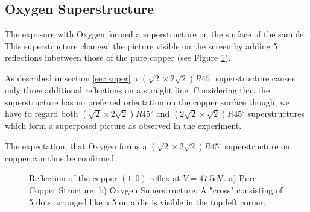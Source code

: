 \documentclass[a4paper]{scrartcl}
\numberwithin{equation}{section}
\numberwithin{figure}{section}
\numberwithin{table}{section}
\begin{document}
\subsection{Oxygen Superstructure}
The exposure with Oxygen formed a superstructure on the surface of the sample. This superstructure changed the picture visible on the screen by adding 5 reflections inbetween those of the pure copper (see Figure \ref{fig:super}).

As described in section \ref{sec:super} a $(\sqrt{2} \times 2\sqrt{2})R45^\circ$ superstructure causes only three additional reflections on a straight line. Considering that the superstructure has no preferred orientation on the copper surface though, we have to regard both $(\sqrt{2} \times 2\sqrt{2})R45^\circ$ and $(2\sqrt{2} \times \sqrt{2})R45^\circ$ superstructures which form a superposed picture as observed in the experiment. 

The expectation, that Oxygen forms a $(\sqrt{2} \times 2\sqrt{2})R45^\circ$ superstructure on copper can thus be confirmed.
\begin{figure} 
 \centering
{}
\hfill
{}
	\caption{\small Reflection of the copper $(1,0)$ reflex at $V=47.5$eV. a) Pure Copper Structure. b) Oxygen Superstructure: A "cross" consisting of 5 dots arranged like a 5 on a die is visible in the top left corner.}
	\label{fig:super}
\end{figure}
\end{document}
